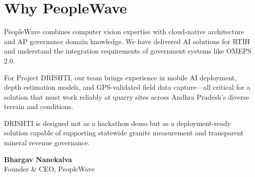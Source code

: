 \documentclass[11pt,a4paper]{article}
\begin{document}
\section{Why PeopleWave}

PeopleWave combines computer vision expertise with cloud-native architecture and AP governance domain knowledge. We have delivered AI solutions for RTIH and understand the integration requirements of government systems like OMEPS 2.0.

For Project DRISHTI, our team brings experience in mobile AI deployment, depth estimation models, and GPS-validated field data capture---all critical for a solution that must work reliably at quarry sites across Andhra Pradesh's diverse terrain and conditions.

DRISHTI is designed not as a hackathon demo but as a deployment-ready solution capable of supporting statewide granite measurement and transparent mineral revenue governance.

\vspace{2em}
\begin{flushright}
\textbf{Bhargav Nanekalva}\\
Founder \& CEO, PeopleWave
\end{flushright}
\end{document}
